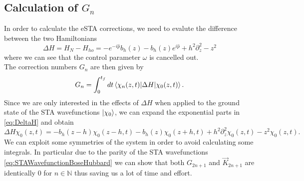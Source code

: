 \subsection{Calculation of $G_{n}$}
In order to calculate the eSTA corrections, we need to evalute the difference between the two Hamiltonians 
\begin{equation}
\label{eq:DeltaH}
	\Delta H = H_{N} - H_{ho} = 
	- e^{-i\hat{p}} b_{h}(z) - b_{h}(z)e^{i\hat{p}} + h^2 \partial_z^2 - z^2 
\end{equation}
where we can see that the control parameter $ \omega $ is cancelled out.\\
The correction numbers $ G_{n} $ are then given by 
\begin{equation}
\label{eq:Gns}
G_{n} = \int_{0}^{t_{f}} dt \braket{\chi_{n}(z,t)| \Delta H|\chi_{0}(z,t)}.
\end{equation}
Since we are only interested in the effects of $ \Delta H  $ when applied to the ground state of the STA wavefunctions $ \ket{\chi_{0}} $, we can expand the exponential parts in \cref{eq:DeltaH} and obtain 
\begin{equation}
\label{eq:DeltaHOnGroundState}
\Delta H \chi_{0}(z,t) = - b_{h}(z-h)\chi_{0}(z-h,t) - b_{h}(z)\chi_{0}(z+h,t) + h^2\partial^2_{z}\chi_{0}(z,t) - z^2\chi_{0}(z,t).
\end{equation}
We can exploit some symmetries of the system in order to avoid calculating some integrals. 
In particular due to the parity of the STA wavefunctions \cref{eq:STAWavefunctionBoseHubbard} we can show that both $ G_{2n+1} $ and $ \vec{K}_{2n +1} $ are identically 0 for $ n \in \mathbb{N} $ thus saving us a lot of time and effort.
